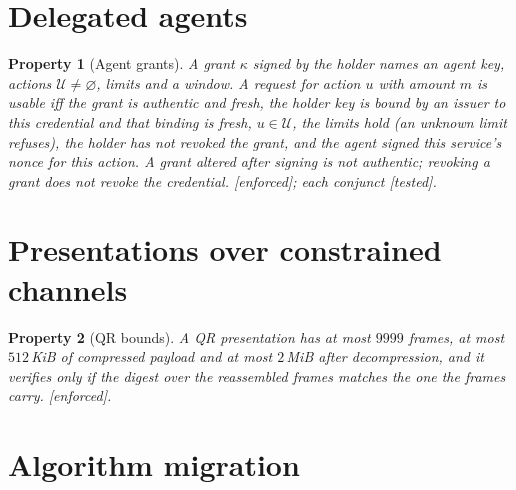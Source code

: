\documentclass[11pt]{article}
\newtheorem{property}{Property}
\theoremstyle{remark}
\newcommand{\emark}[1]{\textup{\textsf{[#1]}}}
\begin{document}
\section{Delegated agents}

\begin{property}[Agent grants] A grant $\kappa$ signed by the holder names an agent key, actions
$\mathcal U\neq\varnothing$, limits and a window. A request for action $u$ with amount $m$ is usable
iff the grant is authentic and fresh, the holder key is bound by an issuer to this credential and
that binding is fresh, $u\in\mathcal U$, the limits hold (an unknown limit refuses), the holder has
not revoked the grant, and the agent signed this service's nonce for this action. A grant altered
after signing is not authentic; revoking a grant does not revoke the credential. \emark{enforced};
each conjunct \emark{tested}.
\end{property}

\section{Presentations over constrained channels}

\begin{property}[QR bounds] A QR presentation has at most $9999$ frames, at most $512$\,KiB of
compressed payload and at most $2$\,MiB after decompression, and it verifies only if the digest over
the reassembled frames matches the one the frames carry. \emark{enforced}.
\end{property}

\section{Algorithm migration}
\end{document}
